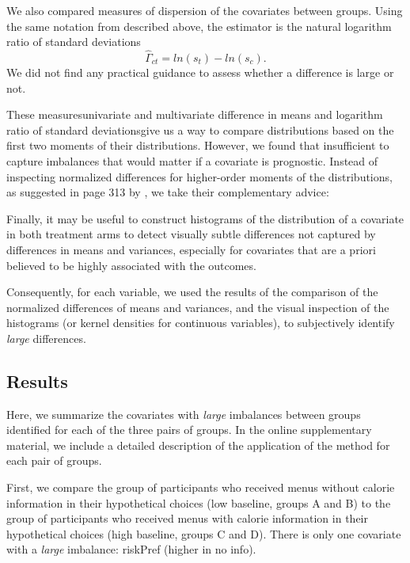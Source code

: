 We also compared measures of dispersion of the covariates between groups. Using the same notation from \citet{imbensCausalInferenceStatistics2015} described above, the estimator is the natural logarithm ratio of standard deviations
\begin{equation*}
  \hat{\Gamma}_{ct}=ln(s_t)-ln(s_c).
\end{equation*}
We did not find any practical guidance to assess whether a difference is large or not.

These measures\textemdash univariate and multivariate difference in means and logarithm ratio of standard deviations\textemdash give us a way to compare distributions based on the first two moments of their distributions. However, we found that insufficient to capture imbalances that would matter if a covariate is prognostic. Instead of inspecting normalized differences for higher-order moments of the distributions, as suggested in page 313 by \citet{imbensCausalInferenceStatistics2015}, we take their complementary advice:

\begin{displayquote}
  Finally, it may be useful to construct histograms of the distribution of a covariate in both treatment arms to detect visually subtle differences not captured by differences in means and variances, especially for covariates that are a priori believed to be highly associated with the outcomes.
\end{displayquote}

Consequently, for each variable, we used the results of the comparison of the normalized differences of means and variances, and the visual inspection of the histograms (or kernel densities for continuous variables), to subjectively identify \emph{large} differences.

\subsection{Results}

Here, we summarize the covariates with \emph{large} imbalances between groups identified for each of the three pairs of groups. In the online supplementary material, we include a detailed description of the application of the method for each pair of groups.

First, we compare the group of participants who received menus without calorie information in their hypothetical choices (low baseline, groups A and B) to the group of participants who received menus with calorie information in their hypothetical choices (high baseline, groups C and D). There is only one covariate with a \emph{large} imbalance: riskPref (higher in no info).

